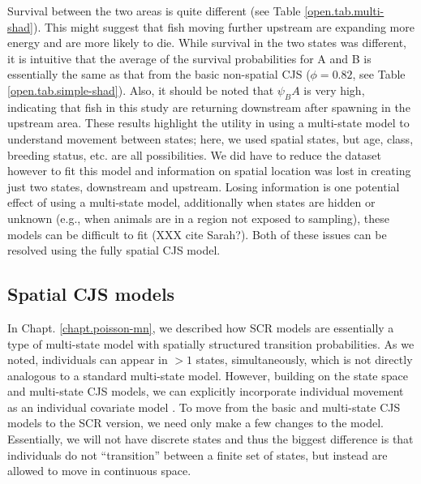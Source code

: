 Survival between the two areas is quite different (see Table \ref{open.tab.multi-shad}).  This might suggest that
fish moving further upstream are expanding more energy and are more likely to die.
While survival in the two states was different, it is intuitive that the average of the survival
probabilities for A and B is essentially the same as that from the
basic non-spatial CJS ($\phi = 0.82$, see Table
\ref{open.tab.simple-shad}).   Also, it should be noted
that $\psi_BA$ is very high, indicating that fish in this study are
returning downstream after spawning in the upstream area.
These results highlight the utility in using a multi-state model to understand movement between states; here,
we used spatial states, but age, class, breeding status, etc. are all possibilities.  We did have to reduce the
dataset however to fit this model and information on spatial location was lost in creating just two states, downstream and upstream.  Losing information is one potential effect of using a multi-state model, additionally when states are hidden or unknown (e.g., when animals are in a region not exposed to 
sampling), these models can be difficult to fit (XXX cite Sarah?).  Both of these issues can be resolved using the fully spatial 
CJS model.  


\subsection{Spatial CJS models}

In Chapt. \ref{chapt.poisson-mn}, we described how SCR models are
essentially a type of multi-state model with spatially structured transition probabilities.
As we noted, individuals can appear in $>1$ states, simultaneously,
which is not directly analogous to a standard multi-state model.  However, building on the state space and
multi-state CJS models, we can
explicitly incorporate individual movement as an
individual covariate model \citep{royle_indcov:2007}.
To move from the basic and multi-state CJS models to the SCR version, we need only make a few
changes to the model.  Essentially, we will not have discrete states and thus the biggest
difference is that individuals do not ``transition'' between a finite set of states, but
instead are allowed to move in continuous space.

